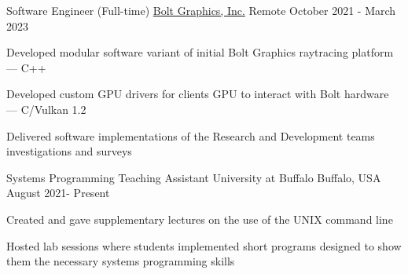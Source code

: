 

\begin{cventries}

  \cventry
    {Software Engineer (Full-time)} %
    {\href{https://www.bolt.graphics/}{Bolt Graphics, Inc.} } %
    {Remote} %
    {October 2021 - March 2023} %
    {
      \begin{cvitems} %
        \item Developed modular software variant of initial Bolt Graphics raytracing platform --- C++
        \item Developed custom GPU drivers for clients GPU to interact with Bolt hardware --- C/Vulkan 1.2
        \item Delivered software implementations of the Research and Development teams investigations and surveys
      \end{cvitems}
    }
  \cventry
    {Systems Programming Teaching Assistant} %
    {University at Buffalo} %
    {Buffalo, USA} %
    {August 2021- Present} %
    {
      \begin{cvitems} %
        \item Created and gave supplementary lectures on the use of the UNIX command line
        \item Hosted lab sessions where students implemented short programs designed to show them the necessary systems programming skills
      \end{cvitems}
    }

\end{cventries}

